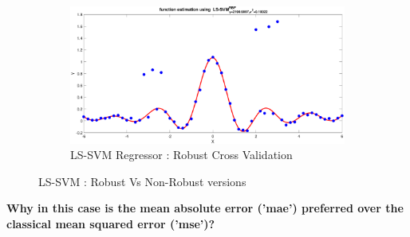 \begin{figure}[!ht]
\begin{subfigure}{.35\textwidth}
		\includegraphics[height=.65\linewidth, width=0.9\linewidth]{Exercise2/Report/robust_huber}
		\caption{LS-SVM Regressor : Robust Cross Validation}
		\label{fig:rob_huber}
	\end{subfigure}
	\caption{LS-SVM : Robust Vs Non-Robust versions}
	\label{fig:robust}
\end{figure}
\textbf{Why in this case is the mean absolute error (’mae’) preferred over the classical mean
	squared error (’mse’)?}

